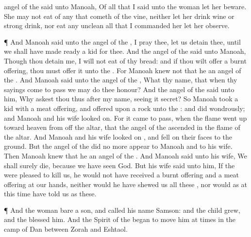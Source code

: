 {angel of the
{}
said unto
Manoah, Of all that I
said unto the
woman let her
beware.
She may not
eat of any
{} that
cometh of the
vine, neither let her
drink
wine or strong
drink, nor
eat any
unclean
{} all that I
commanded her let her
observe.
\par }{\PP {}¶ And
Manoah
said unto the
angel of the
{}, I pray thee, let us
detain thee, until we shall have made
ready a
kid
for thee.
And the
angel of the
{}
said unto
Manoah, Though thou
detain me, I will not
eat of thy
bread: and
if thou wilt
offer a burnt
offering, thou must
offer it unto the
{}. For
Manoah
knew not that he
{} an
angel of the
{}.
And
Manoah
said unto the
angel of the
{}, What
{} thy
name, that when thy
sayings come to
pass we may do thee
honour?
And the
angel of the
{}
said unto him, Why
askest thou thus after my
name, seeing it
{}
secret?
So
Manoah
took a
kid with a meat
offering, and
offered
{} upon a
rock unto the
{}: and
{}
did
wondrously; and
Manoah and his
wife looked
on.
For it came to pass, when the
flame went
up toward
heaven from off the
altar, that the
angel of the
{}
ascended in the
flame of the
altar. And
Manoah and his
wife looked
on
{}, and fell
on their
faces to the
ground.
But the
angel of the
{} did no
more
appear to
Manoah and to his
wife. Then
Manoah
knew that he
{} an
angel of the
{}.
And
Manoah
said unto his
wife, We shall
surely
die, because we have
seen
God.
But his
wife
said unto him,
If the
{} were
pleased to
kill us, he would not have
received a burnt
offering and a meat
offering at our
hands, neither would he have
shewed us all these
{}, nor would as at this
time have
told us
{} as
these.
\par }{\PP {}¶ And the
woman
bare a
son, and
called his
name
Samson: and the
child
grew, and the
{}
blessed him.
And the
Spirit of the
{}
began to move him at
times in the
camp of
Dan between
Zorah and
Eshtaol.

}
